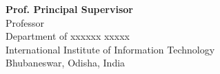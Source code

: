 \vspace*{0.2in}

\begin{flushright}
	\fontsize{12}{10}
	\selectfont
		\textbf{Prof. Principal Supervisor }\\
	\fontsize{10}{10}
	\selectfont
	Professor\\
	Department of xxxxxx xxxxx\\
	International Institute of Information Technology\\
	Bhubaneswar, Odisha, India
		
\end{flushright}%
	
%